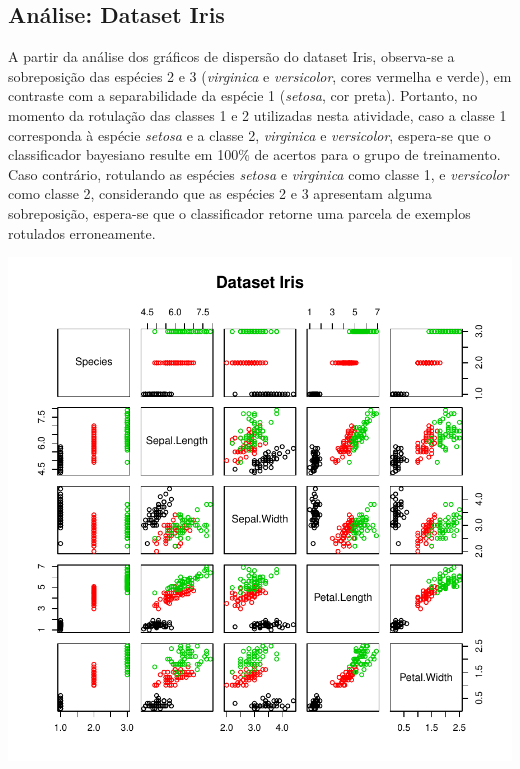 \documentclass{article}
\begin{document}
\subsection{Análise: Dataset Iris}
A partir da análise dos gráficos de dispersão do dataset Iris, observa-se a sobreposição das espécies 2 e 3 (\textit{virginica} e \textit{versicolor}, cores vermelha e verde), em contraste com a separabilidade da espécie 1 (\textit{setosa}, cor preta). Portanto, no momento da rotulação das classes 1 e 2 utilizadas nesta atividade, caso a classe 1 corresponda à espécie \textit{setosa} e a classe 2, \textit{virginica} e \textit{versicolor}, espera-se que o classificador bayesiano resulte em 100\% de acertos para o grupo de treinamento. Caso contrário, rotulando as espécies \textit{setosa} e \textit{virginica} como classe 1, e \textit{versicolor} como classe 2, considerando que as espécies 2 e 3 apresentam alguma sobreposição, espera-se que o classificador retorne uma parcela de exemplos rotulados erroneamente. 
\begin{Schunk}
\end{Schunk}
\includegraphics{gaussrn-003}
\end{document}
